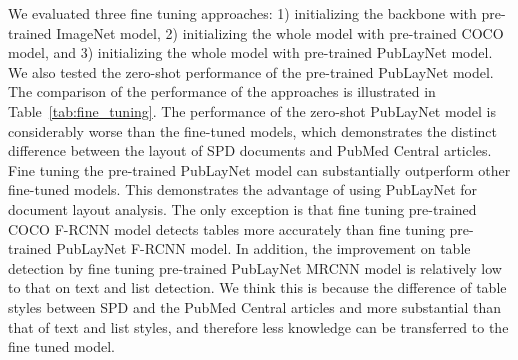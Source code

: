 \documentclass[conference]{IEEEtran}
\begin{document}
We evaluated three fine tuning approaches: 1) initializing the backbone with pre-trained ImageNet model, 2) initializing the whole model with pre-trained COCO model, and 3) initializing the whole model with pre-trained PubLayNet model. We also tested the zero-shot performance of the pre-trained PubLayNet model. The comparison of the performance of the approaches is illustrated in Table~\ref{tab:fine_tuning}. The performance of the zero-shot PubLayNet model is considerably worse than the fine-tuned models, which demonstrates the distinct difference between the layout of SPD documents and PubMed Central\textsuperscript{\texttrademark} articles. Fine tuning the pre-trained PubLayNet model can substantially outperform other fine-tuned models. This demonstrates the advantage of using PubLayNet for document layout analysis. The only exception is that fine tuning pre-trained COCO F-RCNN model detects tables more accurately than fine tuning pre-trained PubLayNet F-RCNN model. In addition, the improvement on table detection by fine tuning pre-trained PubLayNet MRCNN model is relatively low to that on text and list detection. We think this is because the difference of table styles between SPD and the PubMed Central\textsuperscript{\texttrademark} articles and more substantial than that of text and list styles, and therefore less knowledge can be transferred to the fine tuned model.
\end{document}
